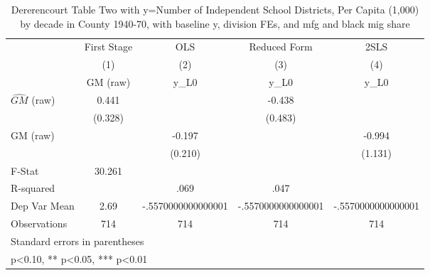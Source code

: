 \begin{table}[htbp]\centering
\def\sym#1{\ifmmode^{#1}\else\(^{#1}\)\fi}
\caption{Dererencourt Table Two with y=Number of Independent School Districts, Per Capita (1,000) by decade in County 1940-70, with baseline y, division FEs, and mfg and black mig share}
\begin{tabular}{l*{4}{c}}
\toprule
                    & First Stage   &         OLS   &Reduced Form   &        2SLS   \\
                    &\multicolumn{1}{c}{(1)}&\multicolumn{1}{c}{(2)}&\multicolumn{1}{c}{(3)}&\multicolumn{1}{c}{(4)}\\
                    &\multicolumn{1}{c}{GM  (raw)}&\multicolumn{1}{c}{y\_L0}&\multicolumn{1}{c}{y\_L0}&\multicolumn{1}{c}{y\_L0}\\
\midrule
$\hat{GM}$ (raw)    &       0.441   &               &      -0.438   &               \\
                    &     (0.328)   &               &     (0.483)   &               \\
\addlinespace
GM  (raw)           &               &      -0.197   &               &      -0.994   \\
                    &               &     (0.210)   &               &     (1.131)   \\
\midrule
F-Stat              &      30.261   &               &               &               \\
R-squared           &               &        .069   &        .047   &               \\
Dep Var Mean        &        2.69   &-.5570000000000001   &-.5570000000000001   &-.5570000000000001   \\
Observations        &         714   &         714   &         714   &         714   \\
\bottomrule
\multicolumn{5}{l}{\footnotesize Standard errors in parentheses}\\
\multicolumn{5}{l}{\footnotesize * p<0.10, ** p<0.05, *** p<0.01}\\
\end{tabular}
\end{table}
